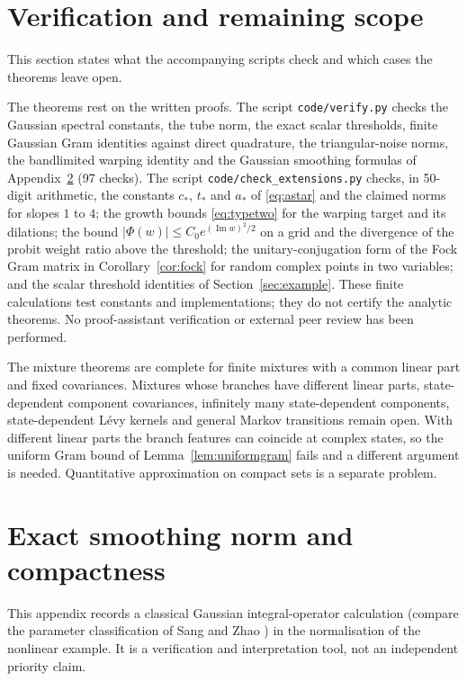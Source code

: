 \documentclass[11pt,a4paper]{article}
\theoremstyle{remark}
\newcommand{\im}{\operatorname{Im}}
\begin{document}
\section{Verification and remaining scope}\label{sec:verification}

This section states what the accompanying scripts check and which cases
the theorems leave open.

The theorems rest on the written proofs. The script
\texttt{code/verify.py} checks the Gaussian spectral constants, the tube
norm, the exact scalar thresholds, finite Gaussian Gram identities
against direct quadrature, the triangular-noise norms, the bandlimited
warping identity and the Gaussian smoothing formulas of
Appendix~\ref{app:spectrum} (97 checks). The script
\texttt{code/check\_extensions.py} checks, in 50-digit arithmetic, the
constants $c_*$, $t_*$ and $a_*$ of \eqref{eq:astar} and the claimed
norms for slopes $1$ to $4$; the growth bounds \eqref{eq:typetwo} for
the warping target and its dilations; the bound $|\Phi(w)|\le
C_0e^{(\im w)^2/2}$ on a grid and the divergence of the probit weight
ratio above the threshold; the unitary-conjugation form of the Fock
Gram matrix in Corollary~\ref{cor:fock} for random complex points in
two variables; and the scalar threshold identities of
Section~\ref{sec:example}. These finite calculations test constants and
implementations; they do not certify the analytic theorems. No
proof-assistant verification or external peer review has been
performed.

The mixture theorems are complete for finite mixtures with a common
linear part and fixed covariances. Mixtures whose branches have
different linear parts, state-dependent component covariances,
infinitely many state-dependent components, state-dependent L\'evy
kernels and general Markov transitions remain open. With different
linear parts the branch features can coincide at complex states, so the
uniform Gram bound of Lemma~\ref{lem:uniformgram} fails and a different
argument is needed. Quantitative approximation on compact sets is a
separate problem.

\appendix
\section{Exact smoothing norm and compactness}\label{app:spectrum}

This appendix records a classical Gaussian integral-operator
calculation (compare the parameter classification of Sang and Zhao
\cite{SangZhao2026}) in the normalisation of the nonlinear example. It
is a verification and interpretation tool, not an independent priority
claim.
\end{document}
